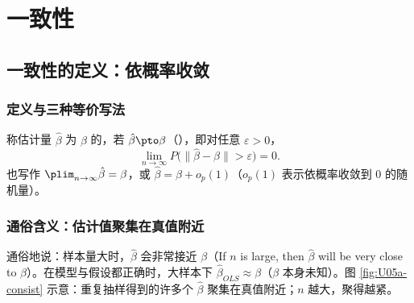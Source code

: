 \section{一致性}\label{sec:U05a-consist}

\subsection{一致性的定义：依概率收敛}

\subsubsection{定义与三种等价写法}

\begin{defn}[一致性]\label{def:U05a-consist}
称估计量 $\hat\beta$ 为 $\beta$ 的，若 $\hat\beta\pto\beta$（），即对任意 $\varepsilon>0$，
\[
\lim_{n\to\infty}P\bigl(\|\hat\beta-\beta\|>\varepsilon\bigr)=0.
\]
也写作 $\plim_{n\to\infty}\hat\beta=\beta$，或 $\hat\beta=\beta+o_p(1)$（$o_p(1)$ 表示依概率收敛到 0 的随机量）。
\end{defn}

\subsubsection{通俗含义：估计值聚集在真值附近}

通俗地说：样本量大时，$\hat\beta$ 会非常接近 $\beta$（If $n$ is large, then $\hat\beta$ will be very close to $\beta$）。在模型与假设都正确时，大样本下 $\hat\beta_{OLS}\approx\beta$（$\beta$ 本身未知）。图 \ref{fig:U05a-consist} 示意：重复抽样得到的许多个 $\hat\beta$ 聚集在真值附近；$n$ 越大，聚得越紧。

